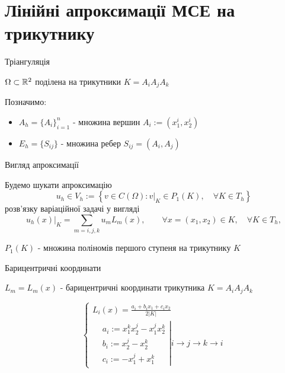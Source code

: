 \section{Лінійні апроксимації МСЕ на трикутнику}
\frame{\sectionpage}
\begin{frame}{Тріангуляція}

	$\Omega \subset \mathbb{R}^2$ поділена на трикутники $K = A_iA_jA_k$

	Позначимо:

	\begin{itemize}
		\item  $A_h = \lbrace A_i \rbrace_{i=1}^n$ - множина вершин $A_i := (x_1^i, x_2^i)$
		\item $E_h = \lbrace S_{ij} \rbrace$ - множина ребер $S_{ij} = (A_i, A_j)$
	\end{itemize}

\end{frame}

\begin{frame}{Вигляд апроксимації}

		Будемо шукати апроксимацію
		\begin{equation}
			u_h \in V_h := \left\lbrace v \in C(\Omega) : v|_K \in P_1(K), \quad \forall K \in T_h \right\rbrace
		\end{equation}
		розв'язку варіаційної задачі у вигляді
		\begin{equation}\label{eq:appr_kind}
			u_h(x)|_K = \sum \limits_{m=i,j,k} u_m L_m (x), \qquad \forall x=(x_1, x_2) \in K, \quad \forall K \in T_h,
		\end{equation}

		$P_1(K)$ - множина поліномів першого ступеня на трикутнику $K$

\end{frame}

\begin{frame}{Барицентричні координати}

	$L_m = L_m(x)$ - барицентричні координати трикутника $K = A_i A_j A_k$

	\begin{equation}\label{eq:barycentric_coord}
		\begin{cases}
			L_i(x) = \frac{a_i + b_i x_1 + c_i x_2}{2 |K|} \\
				\left.
				\begin{split}
					&a_i := x_1^k x_2^j - x_1^j x_2^k \\
					&b_i := x_2^j -x_2^k \\
					&c_i := -x_1^j+x_1^k
				\end{split}
				\right|
				i \to j \to k \to i
		\end{cases}
	\end{equation}

\end{frame}

